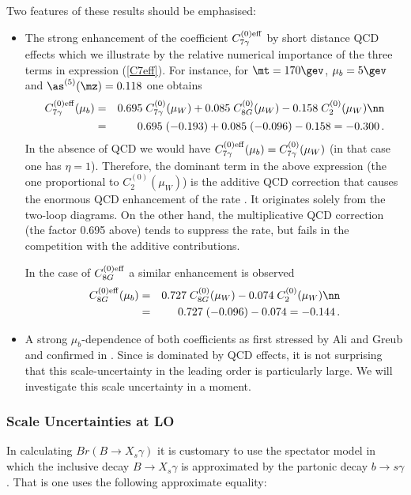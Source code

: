 Two features of these results should be emphasised:
\begin{itemize}
\item
The strong enhancement of the
coefficient $C^{(0){\rm eff}}_{7\gamma}$ by short distance QCD effects which 
we illustrate by the relative numerical importance of the three terms in
expression (\ref{C7eff}).
For instance, for $\mt = 170\gev$, $\mu_b = 5\gev$ and $\as^{(5)}(\mz)
=0.118$ one obtains
\begin{eqnarray}
C^{(0){\rm eff}}_{7\gamma}(\mu_b) &=&
0.695 \; C^{(0)}_{7\gamma}(\mu_W) +
0.085 \; C^{(0)}_{8G}(\mu_W) - 0.158 \; C^{(0)}_2(\mu_W)
\nn\\
 &=& 0.695 \; (-0.193) + 0.085 \; (-0.096) - 0.158 = -0.300 \, .
\label{eq:C7geffnum}
\end{eqnarray}
In the absence of QCD we would have $C^{(0){\rm eff}}_{7\gamma}(\mu_b) =
C^{(0)}_{7\gamma}(\mu_W)$ (in that case one has $\eta = 1$). Therefore, the
dominant term in the above expression (the one proportional to
$C^{(0)}_2(\mu_W)$) is the additive QCD correction that causes the
enormous QCD enhancement of the \Bsg rate \cite{Bert,Desh}.
It originates solely from the two-loop diagrams. On the other hand, the
multiplicative QCD correction (the factor 0.695 above) tends to
suppress the rate, but fails in the competition with the additive
contributions.

In the case of $C^{(0){\rm eff}}_{8G}$ a similar enhancement is observed
\begin{eqnarray}
C^{(0){\rm eff}}_{8G}(\mu_b) &=&
0.727 \; C^{(0)}_{8G}(\mu_W) - 0.074 \; C^{(0)}_2(\mu_W)
\nn \\
 &=& 0.727 \; (-0.096) - 0.074 = -0.144 \, .
\label{eq:C8Geffnum}
\end{eqnarray}
\item
A strong $\mu_b$-dependence of both coefficients   
as first stressed by Ali and Greub \cite{AG1} and confirmed
in \cite{BMMP:94}. 
Since \Bsg is dominated by QCD effects, it is not 
surprising 
that this scale-uncertainty in the leading order 
is particularly large. We will investigate this scale
uncertainty in a moment.
\end{itemize}
\subsubsection{Scale Uncertainties at LO}
In calculating $Br(B\to X_s\gamma)$ it is customary to use the
spectator model in which the inclusive decay $B\to X_s\gamma$
is approximated by the partonic decay $b\to s\gamma$. That is
one uses the following approximate equality: 

